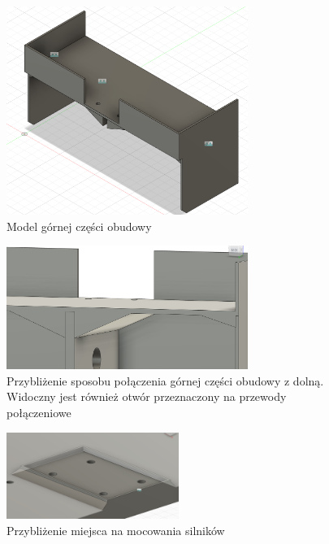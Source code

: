 \begin{figure}[H]
  \centering
  \includegraphics[width=0.7\textwidth]{./graf/upper.png}
  \caption{Model górnej części obudowy}
  \label{fig:ball-close}
\end{figure}

\begin{figure}[H]
  \centering
  \includegraphics[width=0.7\textwidth]{./graf/full-close.png}
  \caption{Przybliżenie sposobu połączenia górnej części obudowy z dolną. Widoczny jest również otwór przeznaczony na przewody połączeniowe}
  \label{fig:full-close}
\end{figure}


\begin{figure}[H]
  \centering
  \includegraphics[width=0.5\textwidth]{./graf/motor-close.png}
  \caption{Przybliżenie miejsca na mocowania silników}
  \label{fig:base-close}
\end{figure}

